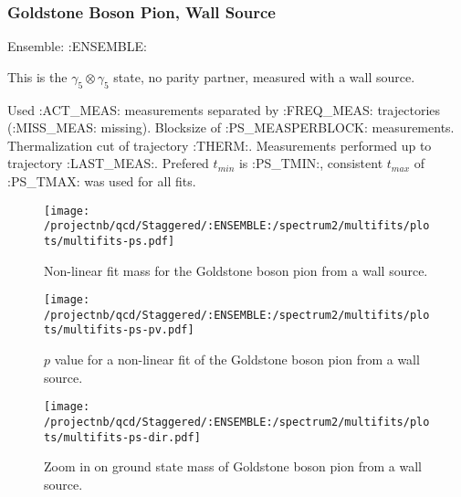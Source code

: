 
\subsubsection{Goldstone Boson Pion, Wall Source}

Ensemble: :ENSEMBLE:

This is the $\gamma_5 \otimes \gamma_5$ state, no parity partner, measured with a wall source.

{\small{Used :ACT_MEAS: measurements separated by :FREQ_MEAS: trajectories (:MISS_MEAS: missing). Blocksize of :PS_MEASPERBLOCK: measurements. Thermalization cut of trajectory :THERM:. Measurements performed up to trajectory :LAST_MEAS:. Prefered $t_{min}$ is :PS_TMIN:, consistent $t_{max}$ of :PS_TMAX: was used for all fits.}}

\begin{comment}
\begin{table}[ht!]
\centering
\scriptsize
\begin{tabular}{|c|c|c|c|}
\hline
 $t_{min}$ & $c_{\pi, GB}$ &  $M_{\pi, GB}$ & $p$-value \\
\hline

\end{tabular}
\caption{Fit values for the goldstone boson pion amplitude and mass, defined by the fit form in Section~\ref{sec:coshcorr}.}
\end{table}
\end{comment}

\begin{multicols}{2}
\begin{figure}[H]
\centering
\texttt{[image: /projectnb/qcd/Staggered/:ENSEMBLE:/spectrum2/multifits/plots/multifits-ps.pdf]}
\caption{Non-linear fit mass for the Goldstone boson pion from a wall source.}
\end{figure}
\columnbreak
\begin{figure}[H]
\centering
\texttt{[image: /projectnb/qcd/Staggered/:ENSEMBLE:/spectrum2/multifits/plots/multifits-ps-pv.pdf]}
\caption{$p$ value for a non-linear fit of the Goldstone boson pion from a wall source.}
\end{figure}
\end{multicols}

\begin{figure}[H]
\centering
\texttt{[image: /projectnb/qcd/Staggered/:ENSEMBLE:/spectrum2/multifits/plots/multifits-ps-dir.pdf]}
\caption{Zoom in on ground state mass of Goldstone boson pion from a wall source.}
\end{figure}

